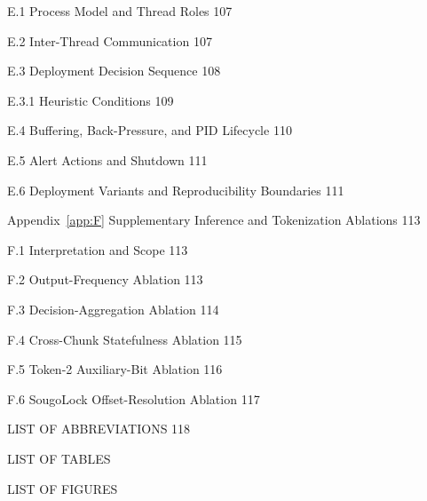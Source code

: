 E.1  Process Model and Thread Roles	107

E.2  Inter-Thread Communication	107

E.3  Deployment Decision Sequence	108

E.3.1  Heuristic Conditions	109

E.4  Buffering, Back-Pressure, and PID Lifecycle	110

E.5  Alert Actions and Shutdown	111

E.6  Deployment Variants and Reproducibility Boundaries	111

Appendix~\ref{app:F} Supplementary Inference and Tokenization Ablations	113

F.1  Interpretation and Scope	113

F.2  Output-Frequency Ablation	113

F.3  Decision-Aggregation Ablation	114

F.4  Cross-Chunk Statefulness Ablation	115

F.5  Token-2 Auxiliary-Bit Ablation	116

F.6  SougoLock Offset-Resolution Ablation	117

LIST OF ABBREVIATIONS	118

LIST OF TABLES

LIST OF FIGURES
